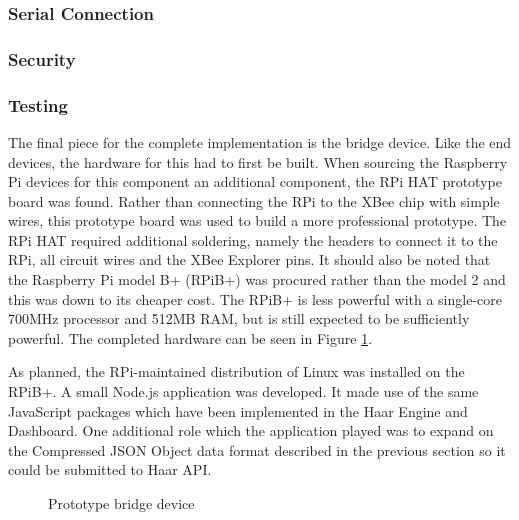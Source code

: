     \subsubsection{Serial Connection}
    \subsubsection{Security}
    \subsubsection{Testing}
      The final piece for the complete implementation is the bridge device. Like the end devices, the hardware for this had to first be built. When sourcing the Raspberry Pi devices for this component an additional component, the RPi HAT prototype board was found. Rather than connecting the RPi to the XBee chip with simple wires, this prototype board was used to build a more professional prototype. The RPi HAT required additional soldering, namely the headers to connect it to the RPi, all circuit wires and the XBee Explorer pins. It should also be noted that the Raspberry Pi model B+ (RPiB+)  was procured rather than the model 2 and this was down to its cheaper cost. The RPiB+ is less powerful with a single-core 700MHz processor and 512MB RAM, but is still expected to be sufficiently powerful. The completed hardware can be seen in Figure \ref{figure:bridge-device}.

      As planned, the RPi-maintained distribution of Linux was installed on the RPiB+. A small Node.js application was developed. It made use of the same JavaScript packages which have been implemented in the Haar Engine and Dashboard. One additional role which the application played was to expand on the Compressed JSON Object data format described in the previous section so it could be submitted to Haar API.

      \begin{figure}
        \centering
        \caption{Prototype bridge device}\label{figure:bridge-device}
      \end{figure}     
